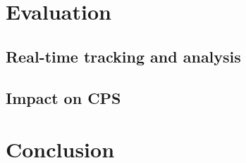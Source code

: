 \section{Evaluation}
\label{sec:Evaluation}

\subsection{Real-time tracking and analysis} %
\label{sub:real_time_tracking_and_analysis}

\subsection{Impact on CPS} %
\label{sub:impact_on_cps}

\section{Conclusion}
\label{sec:Conclusion}
